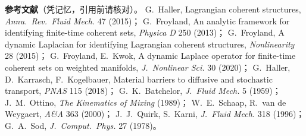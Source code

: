 \documentclass[10.5pt,a4paper]{article}
\begin{document}
\vspace{6pt}\small
\noindent\textbf{参考文献}（凭记忆，引用前请核对）。
G.~Haller, Lagrangian coherent structures, \emph{Annu.\ Rev.\ Fluid Mech.} 47 (2015)；
G.~Froyland, An analytic framework for identifying finite-time coherent sets, \emph{Physica D} 250 (2013)；
G.~Froyland, A dynamic Laplacian for identifying Lagrangian coherent structures, \emph{Nonlinearity} 28 (2015)；
G.~Froyland, E.~Kwok, A dynamic Laplace operator for finite-time coherent sets on weighted manifolds, \emph{J.\ Nonlinear Sci.} 30 (2020)；
G.~Haller, D.~Karrasch, F.~Kogelbauer, Material barriers to diffusive and stochastic transport, \emph{PNAS} 115 (2018)；
G.~K.~Batchelor, \emph{J.\ Fluid Mech.} 5 (1959)；
J.~M.~Ottino, \emph{The Kinematics of Mixing} (1989)；
W.~E.~Schaap, R.~van de Weygaert, \emph{A\&A} 363 (2000)；
J.~J.~Quirk, S.~Karni, \emph{J.\ Fluid Mech.} 318 (1996)；
G.~A.~Sod, \emph{J.\ Comput.\ Phys.} 27 (1978)。
\end{document}
